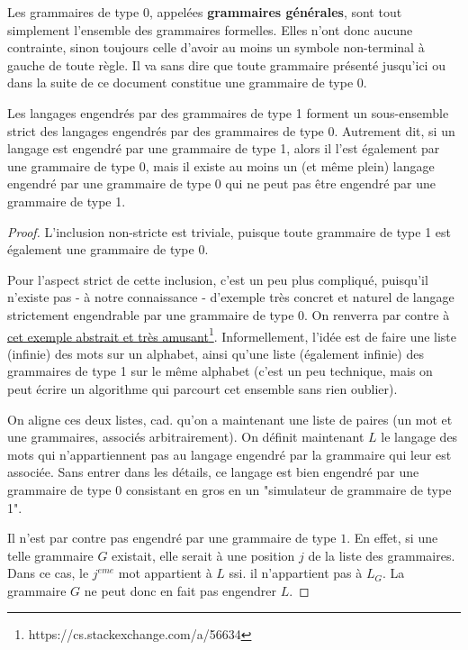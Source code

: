 Les grammaires de type 0, appelées \textbf{grammaires générales}, sont tout simplement l'ensemble des grammaires formelles. Elles n'ont donc aucune contrainte, sinon toujours celle d'avoir au moins un symbole non-terminal à gauche de toute règle.
Il va sans dire que toute grammaire présenté jusqu'ici ou dans la suite de ce document constitue une grammaire de type $0$. 

\begin{lemma}
Les langages engendrés par des grammaires de type 1 forment un sous-ensemble strict des langages engendrés par des grammaires de type 0. Autrement dit, si un langage est engendré par une grammaire de type 1, alors il l'est également par une grammaire de type 0, mais il existe au moins un (et même plein) langage engendré par une grammaire de type 0 qui ne peut pas être engendré par une grammaire de type 1.  
\end{lemma}

\begin{proof}
L'inclusion non-stricte est triviale, puisque toute grammaire de type 1 est également une grammaire de type 0.

Pour l'aspect strict de cette inclusion, c'est un peu plus compliqué, puisqu'il n'existe pas - à notre connaissance - d'exemple très concret et naturel de langage strictement engendrable par une grammaire de type 0. On renverra par contre à \href{https://cs.stackexchange.com/a/56634}{cet exemple abstrait et très amusant}\footnote{https://cs.stackexchange.com/a/56634}. Informellement, l'idée est de faire une liste (infinie) des mots sur un alphabet, ainsi qu'une liste (également infinie) des grammaires de type 1 sur le même alphabet (c'est un peu technique, mais on peut écrire un algorithme qui parcourt cet ensemble sans rien oublier). 

On aligne ces deux listes, cad. qu'on a maintenant une liste de paires (un mot et une grammaires, associés arbitrairement). On définit maintenant $L$ le langage des mots qui n'appartiennent pas au langage engendré par la grammaire qui leur est associée. Sans entrer dans les détails, ce langage est bien engendré par une grammaire de type 0 consistant en gros en un "simulateur de grammaire de type 1".

Il n'est par contre pas engendré par une grammaire de type $1$. En effet, si une telle grammaire $G$ existait, elle serait à une position $j$ de la liste des grammaires. Dans ce cas, le $j^{eme}$ mot appartient à $L$ ssi. il n'appartient pas à $L_G$. La grammaire $G$ ne peut donc en fait pas engendrer $L$.
\end{proof}

